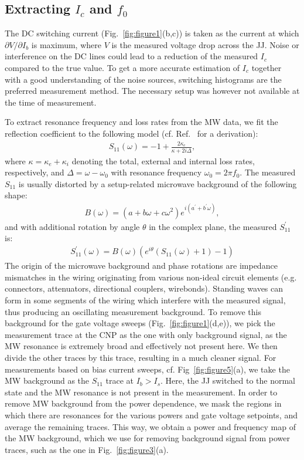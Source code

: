 \subsection{Extracting $I_c$ and $f_0$}\label{sec:SMextraction}

The DC switching current (Fig.~\ref{fig:figure1}(b,c)) is taken as the current at which $\partial V/\partial I_b$ is maximum, where $V$ is the measured voltage drop across the JJ.
%
Noise or interference on the DC lines could lead to a reduction of the measured $I_c$ compared to the true value.
%
To get a more accurate estimation of $I_c$ together with a good understanding of the noise sources, switching histograms are the preferred measurement method.
%
The necessary setup was however not available at the time of measurement.

To extract resonance frequency and loss rates from the MW data, we fit the reflection coefficient to the following model (cf. Ref.~\cite{bosmanBroadbandArchitectureGalvanically2015c} for a derivation):
%
\begin{align}
S_{11}(\omega) = -1+\frac{2\kappa_e}{\kappa+2i\Delta},
\end{align}
%
where $\kappa=\kappa_e+\kappa_i$ denoting the total, external and internal loss rates, respectively, and $\Delta=\omega-\omega_0$ with resonance frequency $\omega_0=2\pi f_0$.
%
The measured $S_{11}$ is usually distorted by a setup-related microwave background of the following shape:
\begin{align}
B(\omega) = \left(a+b\omega+c\omega^2\right)e^{i\left(a^\prime+b^\prime\omega\right)},
\end{align}
%
and with additional rotation by angle $\theta$ in the complex plane, the measured $S_{11}^\prime$ is:
\begin{align}
S_{11}^\prime(\omega)=B(\omega)\left(e^{i\theta}\left(S_{11}(\omega)+1\right)-1\right)
\end{align}
%
The origin of the microwave background and phase rotations are impedance mismatches in the wiring originating from various non-ideal circuit elements (e.g. connectors, attenuators, directional couplers, wirebonds).
%
Standing waves can form in some segments of the wiring which interfere with the measured signal, thus producing an oscillating measurement background.
%
To remove this background for the gate voltage sweeps (Fig.~\ref{fig:figure1}(d,e)), we pick the measurement trace at the CNP as the one with only background signal, as the MW resonance is extremely broad and effectively not present here.
%
We then divide the other traces by this trace, resulting in a much cleaner signal.
%
For measurements based on bias current sweeps, cf. Fig~\ref{fig:figure5}(a), we take the MW background as the $S_{11}$ trace at $I_b>I_s$.
%
Here, the JJ switched to the normal state and the MW resonance is not present in the measurement.
%
In order to remove MW background from the power dependence, we mask the regions in which there are resonances for the various powers and gate voltage setpoints, and average the remaining traces.
%
This way, we obtain a power and frequency map of the MW background, which we use for removing background signal from power traces, such as the one in Fig.~\ref{fig:figure3}(a).

